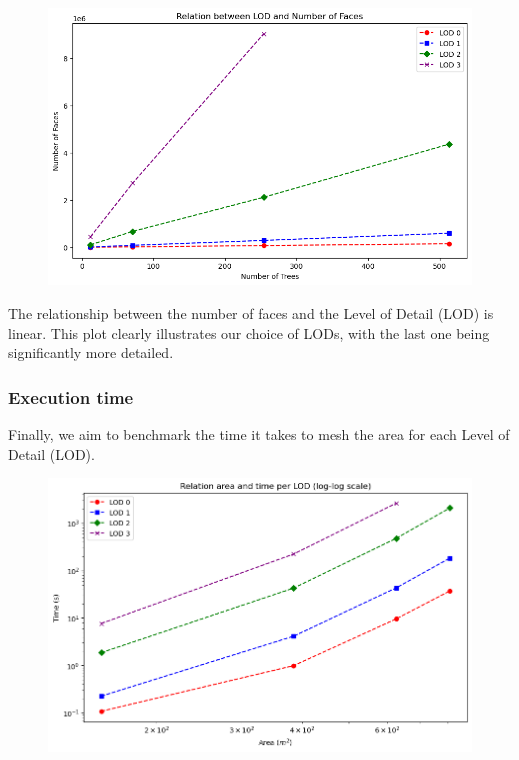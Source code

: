 \documentclass[12pt]{article}
\begin{document}
\begin{figure}[H]
    \centering
    \includegraphics[width=1\textwidth]{images/lod_vs_faces.png}
\end{figure}

The relationship between the number of faces and the Level of Detail (LOD) is
linear. This plot clearly illustrates our choice of LODs, with the last one
being significantly more detailed.

\subsubsection{Execution time}
Finally, we aim to benchmark the time it takes to mesh the area for each Level
of Detail (LOD).

\begin{figure}[H]
    \centering
    \includegraphics[width=1\textwidth]{images/lod_vs_time.png}
\end{figure}
\end{document}
